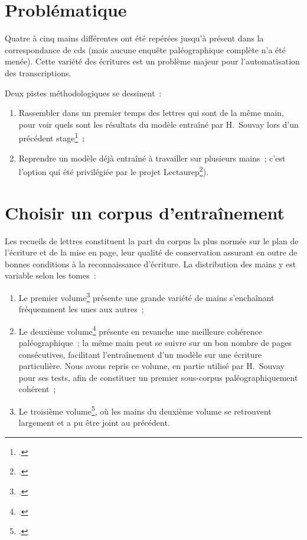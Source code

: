 \documentclass[a4paper,12pt,twoside]{book}
\begin{document}
		\section{Problématique}
		Quatre à cinq mains différentes ont été repérées jusqu'à présent dans la correspondance de \gls{cds} (mais aucune enquête paléographique complète n'a été menée). Cette variété des écritures est un problème majeur pour l'automatisation des transcriptions.
		
		Deux pistes méthodologiques se dessinent~:
		\begin{enumerate}
			\item Rassembler dans un premier temps des lettres qui sont de la même main, pour voir quels sont les résultats du modèle entraîné par H.~Souvay lors d'un précédent stage\footcite{souvayCorrespondanceConstanceSalm2021}~;
			\item Reprendre un modèle déjà entraîné à travailler sur plusieurs mains~; c'est l'option qui été privilégiée par le projet Lectaurep\footcite{chagueCreationModelesTranscriptiona}).
		\end{enumerate}
				
		\section{Choisir un corpus d'entraînement}
		Les recueils de lettres constituent la part du corpus la plus normée sur le plan de l'écriture et de la mise en page, leur qualité de conservation assurant en outre de bonnes conditions à la reconnaissance d'écriture. La distribution des mains y est variable selon les tomes :
		\begin{enumerate}
			\item Le premier volume\footcite{salmCorrespondanceGeneraleSecondea} présente une grande variété de mains s'enchaînant fréquemment les unes aux autres~;
			\item Le deuxième volume\footcite{salmCorrespondanceGeneraleSeconde}  présente en revanche une meilleure cohérence paléographique : la même main peut se suivre sur un bon nombre de pages consécutives, facilitant l'entraînement d'un modèle sur une écriture particulière. Nous avons repris ce volume, en partie utilisé par H. Souvay pour ses tests, afin de constituer un premier sous-corpus paléographiquement cohérent~;
			\item Le troisième volume\footcite{salmCorrespondanceGeneraleSecondeb}, où les mains du deuxième volume se retrouvent largement et a pu être joint au précédent.
		\end{enumerate}
	
\end{document}
